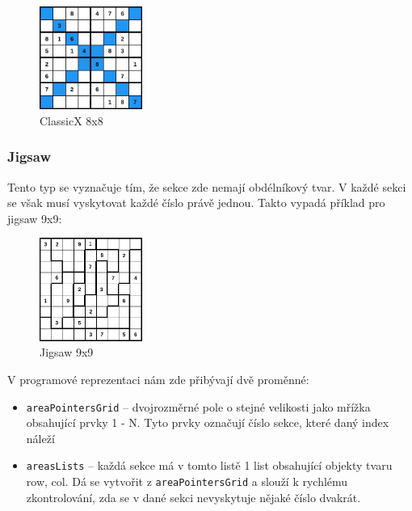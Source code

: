 \documentclass[a4paper,oneside,12pt]{report}
\begin{document}
\begin{figure}[H]
   \centering
   \includegraphics[width=0.3\textwidth]{../img/8x8DiagSudoku.jpg}
   \caption[ClassicX 8x8]{ClassicX 8x8}
   \label{fig:8x8DiagSudoku}
\end{figure}

\subsubsection{Jigsaw}
Tento typ se vyznačuje tím, že sekce zde nemají obdélníkový tvar. V každé sekci se však musí vyskytovat každé číslo právě jednou. Takto vypadá příklad pro jigsaw 9x9:

\begin{figure}[H]
   \centering
   \includegraphics[width=0.3\textwidth]{../img/9x9jigsaw.jpg}
   \caption[Jigsaw 9x9]{Jigsaw 9x9}
   \label{fig:9x9jigsaw}
\end{figure}

V programové reprezentaci nám zde přibývají dvě proměnné:
\begin{itemize}
   \item \texttt{areaPointersGrid} -- dvojrozměrné pole o stejné velikosti jako mřížka obsahující prvky 1 - N. Tyto prvky označují číslo sekce, které daný index náleží
   \item \texttt{areasLists} -- každá sekce má v tomto listě 1 list obsahující objekty tvaru {row, col}. Dá se vytvořit z \texttt{areaPointersGrid} a slouží k rychlému zkontrolování, zda se v dané sekci nevyskytuje nějaké číslo dvakrát.
\end{itemize}
\end{document}
